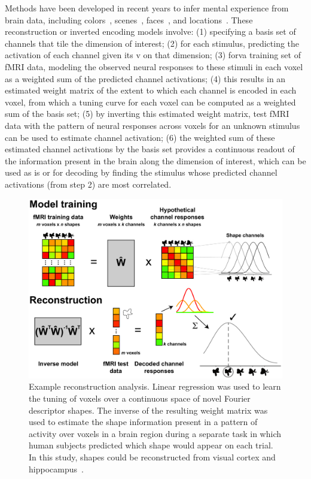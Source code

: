 Methods have been developed in recent years to infer
mental experience from brain data, including
colors~\citep{Brouwer:2009}, scenes~\citep{Naselaris:2009},
faces~\citep{Cowen:2014}, and locations~\citep{Sprague:2016}. These 
reconstruction or inverted encoding models
involve: (1) specifying a basis set of channels that tile the
dimension of interest; (2) for each stimulus, predicting the activation of each
channel given its v on
that dimension; (3) forva training set of fMRI data, modeling the
observed neural responses to these stimuli in each voxel as a weighted
sum of the predicted channel activations; (4) this results in an
estimated weight matrix of the extent to which each channel is encoded
in each voxel, from which a tuning curve for each voxel can be
computed as a weighted sum of the basis set; (5) by inverting this
estimated weight matrix, test fMRI data with the pattern of neural
responses across voxels for an unknown stimulus can be used to
estimate channel activation; (6) the weighted sum of these estimated
channel activations by the basis set provides a continuous readout of
the information present in the brain along the dimension of interest,
which can be used as is or for decoding by finding the stimulus whose
predicted channel activations (from step 2) are most correlated.

\setlength{\columnsep}{20pt}
\begin{figure}
\centering
\includegraphics[width=.48\textwidth]{figs/inverse}
\caption{\small Example reconstruction analysis. Linear regression was
used to learn the tuning of voxels over a continuous space of novel
Fourier descriptor shapes. The inverse of the resulting weight matrix
was used to estimate the shape information present in a pattern of
activity over voxels in a brain region during a separate task in which
human subjects predicted which shape would appear on each trial.
In this study, shapes could be reconstructed from visual cortex and
hippocampus~\citep{Kok:2018}.}
    \label{fig:hippo}
    \vskip2pt
\end{figure}

